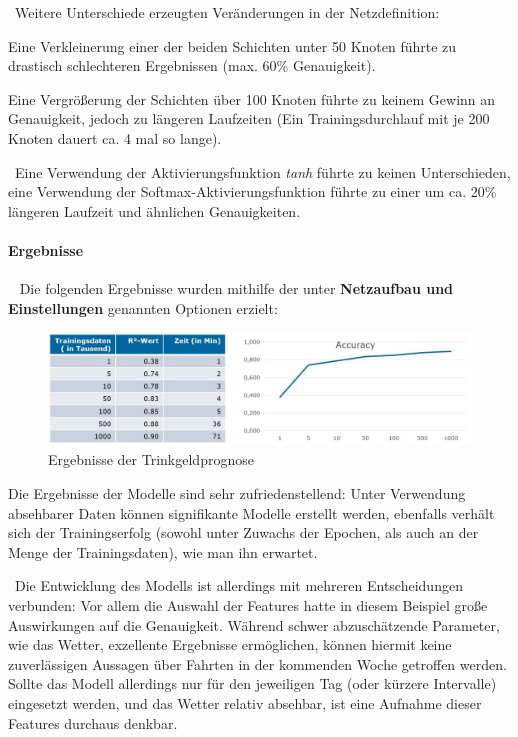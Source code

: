 ~\newline Weitere Unterschiede erzeugten Veränderungen in der Netzdefinition: 

Eine Verkleinerung einer der beiden Schichten unter 50 Knoten führte zu drastisch schlechteren Ergebnissen (max. 60\% Genauigkeit). 

Eine Vergrößerung der Schichten über 100 Knoten führte zu keinem Gewinn an Genauigkeit, jedoch zu längeren Laufzeiten (Ein Trainingsdurchlauf mit je 200 Knoten dauert ca. 4 mal so lange).

~\newline Eine Verwendung der Aktivierungsfunktion \textit{tanh} führte zu keinen Unterschieden, eine Verwendung der Softmax-Aktivierungsfunktion führte zu einer um ca. 20\% längeren Laufzeit und ähnlichen Genauigkeiten. 
\paragraph{Ergebnisse} ~\newline
Die folgenden Ergebnisse wurden mithilfe der unter \textbf{Netzaufbau und Einstellungen} genannten Optionen erzielt:

\begin{figure}[h]
	\begin{center}
		\includegraphics[width=0.95\linewidth]{Bilder/TrinkgeldErgebnisse}
		\caption[Ergebnisse der Trinkgeldprognose]{Ergebnisse der Trinkgeldprognose}
		\label{fig:TipErg}
	\end{center}
\end{figure}

Die Ergebnisse der Modelle sind sehr zufriedenstellend: Unter Verwendung absehbarer Daten können signifikante Modelle erstellt werden, ebenfalls verhält sich der Trainingserfolg (sowohl unter Zuwachs der Epochen, als auch an der Menge der Trainingsdaten), wie man ihn erwartet. 

~\newline Die Entwicklung des Modells ist allerdings mit mehreren Entscheidungen verbunden: Vor allem die Auswahl der Features hatte in diesem Beispiel große Auswirkungen auf die Genauigkeit. Während schwer abzuschätzende Parameter, wie das Wetter, exzellente Ergebnisse ermöglichen, können hiermit keine zuverlässigen Aussagen über Fahrten in der kommenden Woche getroffen werden. Sollte das Modell allerdings nur für den jeweiligen Tag (oder kürzere Intervalle) eingesetzt werden, und das Wetter relativ absehbar, ist eine Aufnahme dieser Features durchaus denkbar. 


